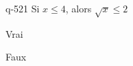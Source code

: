 \begin{truefalse}{q-521}
Si $x \leq 4$, alors $\sqrt x\leq 2$
\item Vrai
\item* Faux
\end{truefalse}

